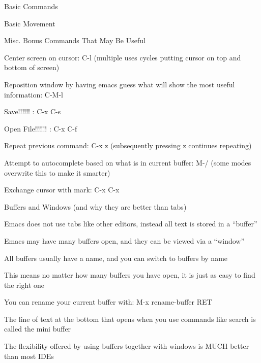 \documentclass[presentation]{beamer}
\begin{document}
\begin{frame}[label=sec-2]{Basic Commands}
\begin{block}{Basic Movement}
\begin{block}{Misc. Bonus Commands That May Be Useful}
\begin{block}{Center screen on cursor: C-l (multiple uses cycles putting cursor on top and bottom of screen)}
\begin{block}{Reposition window by having emacs guess what will show the most useful information: C-M-l}
\end{block}
\end{block}
\begin{block}{Save!!!!!! : C-x C-s}
\end{block}
\begin{block}{Open File!!!!!! : C-x C-f}
\end{block}
\begin{block}{Repeat previous command: C-x z (subsequently pressing z continues repeating)}
\end{block}
\begin{block}{Attempt to autocomplete based on what is in current buffer: M-/ (some modes overwrite this to make it smarter)}
\end{block}
\begin{block}{Exchange cursor with mark: C-x C-x}
\end{block}
\end{block}
\end{block}
\begin{block}{Buffers and Windows (and why they are better than tabs)}
\begin{block}{Emacs does not use tabs like other editors, instead all text is stored in a ``buffer''}
\end{block}
\begin{block}{Emacs may have many buffers open, and they can be viewed via a ``window''}
\end{block}
\begin{block}{All buffers usually have a name, and you can switch to buffers by name}
\begin{block}{This means no matter how many buffers you have open, it is just as easy to find the right one}
\end{block}
\begin{block}{You can rename your current buffer with: M-x rename-buffer RET}
\end{block}
\end{block}
\begin{block}{The line of text at the bottom that opens when you use commands like search is called the mini buffer}
\end{block}
\begin{block}{The flexibility offered by using buffers together with windows is MUCH better than most IDEs}

\end{block}
\end{block}
\end{frame}
\end{document}
